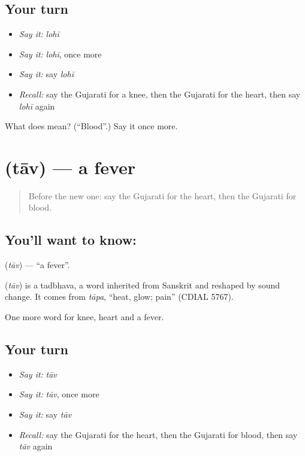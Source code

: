\subsection*{Your turn}
\begin{itemize}
\raggedright
  \item \emph{Say it:} \emph{lohī}
  \item \emph{Say it:} \emph{lohī}, once more
  \item \emph{Say it:} say \emph{lohī}
  \item \emph{Recall:} say the Gujarati for a knee, then the Gujarati for the heart, then say \emph{lohī} again
\end{itemize}

\begin{tcolorbox}[breakable,colback=teal!4,colframe=teal!35!black,title={Before you move on}]
What does  mean? (\textquotedblleft{}Blood\textquotedblright{}.) Say it once more.
\end{tcolorbox}
\section[\texorpdfstring{\gu{તાવ} (tāv)}{તાવ (tāv)}]{ (tāv) — a fever}

\label{lesson:GU-C48-fever}



\begin{quote}
Before the new one: say the Gujarati for the heart, then the Gujarati for blood.
\end{quote}

\subsection*{You'll want to know: }
\textbf{} (\emph{tāv}) — \textquotedblleft{}a fever\textquotedblright{}.

\begin{cousinweb}
\textbf{} (\emph{tāv}) is a tadbhava, a word inherited from Sanskrit and reshaped by sound change. It comes from \emph{tāpa}, \textquotedblleft{}heat, glow; pain\textquotedblright{} (CDIAL 5767).
\end{cousinweb}

\begin{grammarlens}[title={What you've built}]
One more word for knee, heart and a fever.
\end{grammarlens}

\subsection*{Your turn}
\begin{itemize}
\raggedright
  \item \emph{Say it:} \emph{tāv}
  \item \emph{Say it:} \emph{tāv}, once more
  \item \emph{Say it:} say \emph{tāv}
  \item \emph{Recall:} say the Gujarati for the heart, then the Gujarati for blood, then say \emph{tāv} again
\end{itemize}


